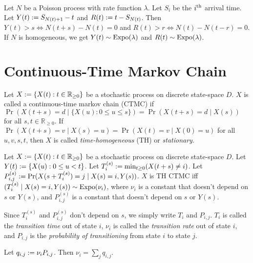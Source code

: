 \documentclass[a4paper, 12pt, fleqn]{article}
\DeclareMathOperator{\Expo}{\opname{Expo}}
\begin{document}
\begin{lemma}
Let $N$ be a Poisson process with rate function $\lambda$.
Let $S_i$ be the $i^{\textrm{th}}$ arrival time.
Let $Y(t) := S_{N(t)+1}-t$ and $R(t) := t - S_{N(t)}$.
Then $Y(t) > s \iff N(t+s)-N(t) = 0$ and $R(t) > r \iff N(t)-N(t-r) = 0$.
If $N$ is homogeneous, we get $Y(t) \sim \Expo(\lambda)$ and $R(t) \sim \Expo(\lambda)$.
\end{lemma}

\section{Continuous-Time Markov Chain}

\begin{definition}[CTMC]
Let $X := \{X(t): t \in \mathbb{R}_{\ge 0}\}$ be a stochastic process
on discrete state-space $D$.
$X$ is called a continuous-time markov chain (CTMC) if
$\Pr(X(t+s) = d \mid \{X(u): 0 \le u \le s\}) = \Pr(X(t+s)=d \mid X(s))$
for all $s, t \in \mathbb{R}_{\ge 0}$.
If $\Pr(X(t+s)=v \mid X(s)=u) = \Pr(X(t)=v \mid X(0)=u)$ for all $u, v, s, t$,
then $X$ is called \emph{time-homogeneous} (TH) or \emph{stationary}.
\end{definition}

\begin{theorem}
Let $X := \{X(t): t \in \mathbb{R}_{\ge 0}\}$ be a stochastic process
on discrete state-space $D$. Let $Y(t) := \{X(u): 0 \le u < t \}$.
Let $T_i^{(s)} := \min_{t \ge 0} (X(t+s) \neq i)$.
Let $P^{(s)}_{i,j} := \Pr(X(s+T_i^{(s)})=j \mid X(s)=i, Y(s))$.
$X$ is TH CTMC iff $(T_i^{(s)} \mid X(s)=i, Y(s)) \sim \Expo(\nu_i)$,
where $\nu_i$ is a constant that doesn't depend on $s$ or $Y(s)$,
and $P^{(s)}_{i,j}$ is a constant that doesn't depend on $s$ or $Y(s)$.

Since $T_i^{(s)}$ and $P^{(s)}_{i,j}$ don't depend on $s$, we simply write $T_i$ and $P_{i,j}$.
$T_i$ is called the \emph{transition time} out of state $i$,
$\nu_i$ is called the \emph{transition rate} out of state $i$,
and $P_{i,j}$ is the \emph{probability of transitioning} from state $i$ to state $j$.
\end{theorem}

Let $q_{i,j} := \nu_iP_{i,j}$. Then $\nu_i = \sum_j q_{i,j}$.
\end{document}
